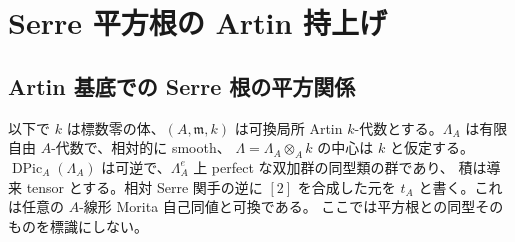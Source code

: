 \section{Serre 平方根の Artin 持上げ}
\label{sec:artin-serre-roots}
\subsection{Artin 基底での Serre 根の平方関係}

以下で $k$ は標数零の体、$(A,\mathfrak m,k)$ は可換局所 Artin
$k$-代数とする。$\Lambda_A$ は有限自由 $A$-代数で、相対的に smooth、
$\Lambda=\Lambda_A\otimes_Ak$ の中心は $k$ と仮定する。
$\operatorname{DPic}_A(\Lambda_A)$ は可逆で、$\Lambda_A^e$ 上 perfect な双加群の同型類の群であり、
積は導来 tensor とする。相対 Serre 関手の逆に $[2]$ を合成した元を
$t_A$ と書く。これは任意の $A$-線形 Morita 自己同値と可換である。
ここでは平方根との同型そのものを標識にしない。

